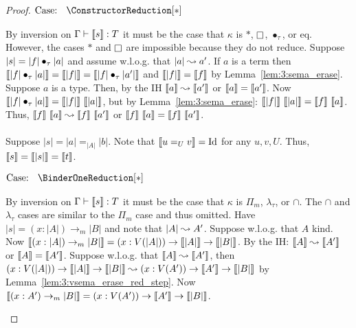 \begin{proof}
    $\text{Case: }\begin{array}{c} \ConstructorReduction[*] \end{array}$
    \begin{proofcase}
        By inversion on $\Gamma \vdash \llbracket s \rrbracket : T$ it must be the case that $\kappa$ is $*$, $\kind$, $\bullet_\tau$, or eq.
        However, the cases $*$ and $\kind$ are impossible because they do not reduce.
        Suppose $|s| = |f| \bullet_{\tau} |a|$ and assume w.l.o.g. that $|a| \leadsto a^\prime$.
        If $a$ is a term then $\llbracket |f| \bullet_{\tau} |a| \rrbracket = \llbracket |f| \rrbracket = \llbracket |f| \bullet_{\tau} |a^\prime| \rrbracket$ and $\llbracket |f| \rrbracket = \llbracket f \rrbracket$ by Lemma~\ref{lem:3:sema_erase}.
        Suppose $a$ is a type.
        Then, by the IH $\llbracket a \rrbracket \leadsto \llbracket a^\prime \rrbracket$ or $\llbracket a \rrbracket = \llbracket a^\prime \rrbracket$.
        Now $\sema{\app{|f|}{\tau}{|a|}} = \sema{|f|}\ \sema{|a|}$, but by Lemma~\ref{lem:3:sema_erase}: $\sema{|f|}\ \sema{|a|} = \sema{f}\ \sema{a}$.
        Thus, $\llbracket f \rrbracket\ \llbracket a \rrbracket \leadsto \llbracket f \rrbracket\ \llbracket a^\prime \rrbracket$ or $\sema{f}\ \sema{a} = \sema{f}\ \sema{a^\prime}$.
        \\ \\
        Suppose $|s| = |a| =_{|A|} |b|$.
        Note that $\llbracket u =_U v \rrbracket = \textnormal{Id}$ for any $u, v, U$.
        Thus, $\llbracket s \rrbracket = \llbracket |s| \rrbracket = \llbracket t \rrbracket$.
    \end{proofcase}

    $\text{Case: }\begin{array}{c} \BinderOneReduction[*] \end{array}$
    \begin{proofcase}
        By inversion on $\Gamma \vdash \llbracket s \rrbracket : T$ it must be the case that $\kappa$ is $\Pi_m$, $\lambda_\tau$, or $\cap$.
        The $\cap$ and $\lambda_\tau$ cases are similar to the $\Pi_m$ case and thus omitted.
        Have $|s| = (x : |A|) \to_m |B|$ and note that $|A| \leadsto A^\prime$.
        Suppose w.l.o.g. that $A$ kind.
        Now $\llbracket (x : |A|) \to_m |B| \rrbracket = (x : V(|A|)) \to \llbracket |A| \rrbracket \to \llbracket |B| \rrbracket$.
        By the IH: $\llbracket A \rrbracket \leadsto \llbracket A^\prime \rrbracket$ or $\llbracket A \rrbracket = \llbracket A^\prime \rrbracket$.
        Suppose w.l.o.g. that $\llbracket A \rrbracket \leadsto \llbracket A^\prime \rrbracket$, then $(x : V(|A|)) \to \llbracket |A| \rrbracket \to \llbracket |B| \rrbracket \leadsto (x : V(A^\prime)) \to \llbracket A^\prime \rrbracket \to \llbracket |B| \rrbracket$ by Lemma~\ref{lem:3:vsema_erase_red_step}.
        Now $\llbracket (x : A^\prime) \to_m |B| \rrbracket = (x : V(A^\prime)) \to \llbracket A^\prime \rrbracket \to \llbracket |B| \rrbracket$.
    \end{proofcase}


\end{proof}
